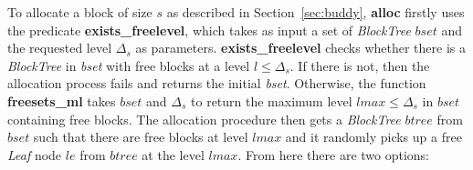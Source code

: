 %
%


To allocate a block of size $s$ as described in Section~\ref{sec:buddy}, \textbf{alloc} firstly uses the predicate \textbf{exists\_freelevel}, which takes as input a set of \emph{BlockTree} $bset$ and the requested level $\Delta_s$ as parameters. \textbf{exists\_freelevel} checks whether there is a \emph{BlockTree} in \emph{bset} with free blocks at a level $l \leq \Delta_s$. If there is not, then the allocation process fails and returns the initial \emph{bset}. Otherwise, the function \textbf{freesets\_ml} takes $bset$ and $\Delta_s$ to return the maximum level $lmax \leq \Delta_s$ in $bset$ containing free blocks. The allocation procedure then gets a \emph{BlockTree} $btree$ from $bset$ such that there are free blocks at level $lmax$ and it randomly picks up a free \emph{Leaf} node $le$ from $btree$ at the level $lmax$. From here there are two options:

